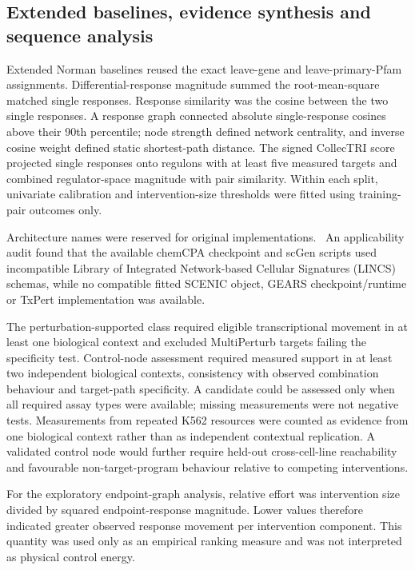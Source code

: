 \documentclass[a4paper,fleqn]{cas-sc}
\makeatletter
\DeclareRobustCommand{\rev}[1]{{\color{red}\def\@citecolor{black}\def\@linkcolor{red}\def\@urlcolor{red}#1}}
\let\unmarkedcite\cite
\renewcommand{\cite}[1]{{\color{black}\def\@citecolor{black}\unmarkedcite{#1}}}
\makeatother
\begin{document}
\subsection*{Extended baselines, evidence synthesis and sequence analysis}

Extended Norman baselines reused the exact leave-gene and leave-primary-Pfam assignments. Differential-response magnitude summed the root-mean-square matched single responses. Response similarity was the cosine between the two single responses. A response graph connected absolute single-response cosines above their 90th percentile; node strength defined network centrality, and inverse cosine weight defined static shortest-path distance. The signed CollecTRI score projected single responses onto regulons with at least five measured targets and combined regulator-space magnitude with pair similarity. Within each split, univariate calibration and intervention-size thresholds were fitted using training-pair outcomes only.

Architecture names were reserved for original implementations.~\cite{scenic2017,gears2024,scgen2019,cpa2023,chemcpa2022,txpert2026} An applicability audit found that the available chemCPA checkpoint and scGen scripts used incompatible Library of Integrated Network-based Cellular Signatures (LINCS) schemas, while no compatible fitted SCENIC object, GEARS checkpoint/runtime or TxPert implementation was available.

\rev{The perturbation-supported class required eligible transcriptional movement in at least one biological context and excluded MultiPerturb targets failing the specificity test.} \rev{Control-node assessment required measured support in at least two independent biological contexts, consistency with observed combination behaviour and target-path specificity.} \rev{A candidate could be assessed only when all required assay types were available; missing measurements were not negative tests.} Measurements from repeated K562 resources were counted as evidence from one biological context rather than as independent contextual replication. A validated control node would further require held-out cross-cell-line reachability and favourable non-target-program behaviour relative to competing interventions.

\rev{For the exploratory endpoint-graph analysis, relative effort was intervention size divided by squared endpoint-response magnitude.} Lower values therefore indicated greater observed response movement per intervention component. This quantity was used only as an empirical ranking measure and was not interpreted as physical control energy.
\end{document}
